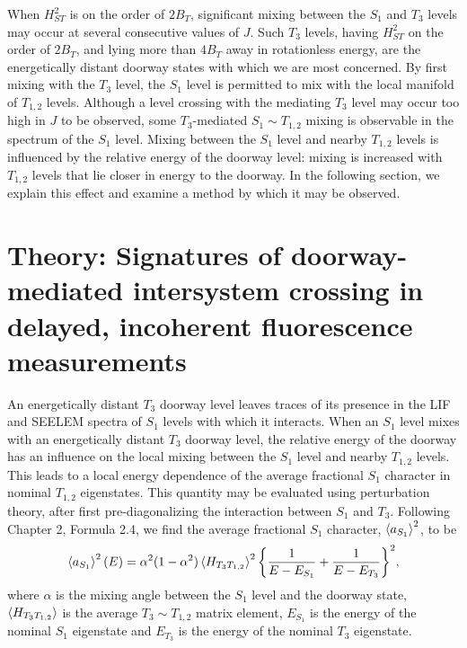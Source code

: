 \documentclass[12pt]{mitthesis}
\begin{document}
When $H_{ST}^2$ is on the order of $2B_T$, significant mixing between
the $S_1$ and $T_3$ levels may occur at several consecutive values of
$J$.  Such $T_3$ levels, having $H_{ST}^2$ on the order of $2B_T$, and
lying more than $4B_T$ away in rotationless energy, are the
energetically distant doorway states with which we are most concerned.
By first mixing with the $T_3$ level, the $S_1$ level is permitted to
mix with the local manifold of $T_{1,2}$ levels.  Although a level
crossing with the mediating $T_3$ level may occur too high in $J$ to
be observed, some $T_3$-mediated $S_1 \sim T_{1,2}$ mixing is
observable in the spectrum of the $S_1$ level.  Mixing between the
$S_1$ level and nearby $T_{1,2}$ levels is influenced by the relative
energy of the doorway level: mixing is increased with $T_{1,2}$ levels
that lie closer in energy to the doorway.  In the following section,
we explain this effect and examine a method by which it may be
observed.



























\section{Theory: Signatures of doorway-mediated intersystem crossing
  in delayed, incoherent fluorescence measurements}

An energetically distant $T_3$ doorway level leaves traces of its
presence in the LIF and SEELEM spectra of $S_1$ levels with which it
interacts.  When an $S_1$ level mixes with an energetically distant
$T_3$ doorway level, the relative energy of the doorway has an
influence on the local mixing between the $S_1$ level and nearby
$T_{1,2}$ levels.  This leads to a local energy dependence of the
average fractional $S_1$ character in nominal $T_{1,2}$ eigenstates.
This quantity may be evaluated using perturbation theory, after first
pre-diagonalizing the interaction between $S_1$ and $T_3$.  Following
Chapter 2, Formula 2.4, we find the average fractional $S_1$
character, $\mathinner{\langle{a_{S_1}}\rangle}^2$, to be
\begin{equation}
  \label{eq:ave-s1-char}
    \mathinner{\langle{a_{S_1}}\rangle}^2(E) = 
    \alpha^2 (1-\alpha^2) \mathinner{\langle{H_{T_3T_{1,2}}}\rangle}^2
    \biggl \lbrace 
    \frac{1}{E - E_{S_1}} 
    + \frac{1}{E - E_{T_3}} 
    \biggr \rbrace^2,
\end{equation}
where $\alpha$ is the mixing angle between the $S_1$ level and the
doorway state, $\mathinner{\langle{H_{T_3T_{1,2}}}\rangle}$ is the average $T_3 \sim
T_{1,2}$ matrix element, $E_{S_1}$ is the energy of the nominal $S_1$
eigenstate and $E_{T_3}$ is the energy of the nominal $T_3$
eigenstate.  
\end{document}
